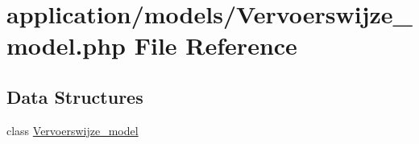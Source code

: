 \hypertarget{_vervoerswijze__model_8php}{}\section{application/models/\+Vervoerswijze\+\_\+model.php File Reference}
\label{_vervoerswijze__model_8php}
\subsection*{Data Structures}
\begin{DoxyCompactItemize}
\item 
class \mbox{\hyperlink{class_vervoerswijze__model}{Vervoerswijze\+\_\+model}}
\end{DoxyCompactItemize}
